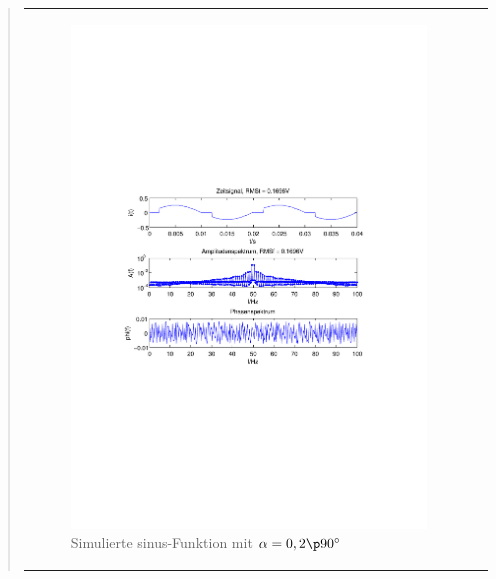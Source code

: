 \begin{quote}
\begin{center}
\begin{tabular}{ll}
        \hspace{-2.5cm}
            \begin{minipage}{0.6\textwidth}
                
                \begin{figure}[H]
                    \label{fig:sin_f-50_a-0}
                    \includegraphics[scale=0.55, trim = 35mm 100mm 35mm 95mm, clip]{Bilder/sin_f-50_a-0,2}
                    \caption{Simulierte sinus-Funktion mit $\alpha = 0,2 \p 90^\circ$}
                \end{figure}
        
            \end{minipage}
        

\end{tabular}
\end{center}
\end{quote}
